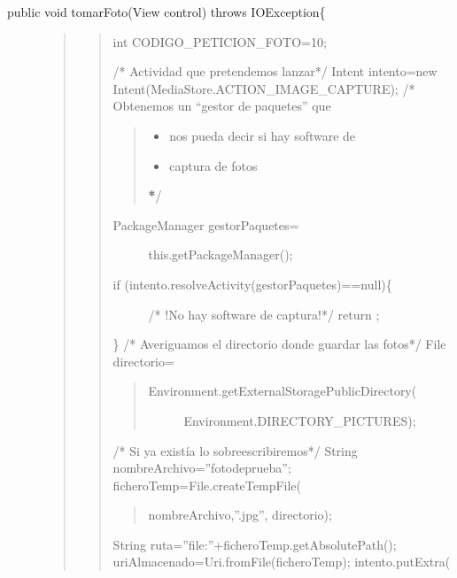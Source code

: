 \documentclass[a4paper,12pt,spanish]{sphinxmanual}
\begin{document}
\begin{description}
\item[{public void tomarFoto(View control) throws IOException\{}] \leavevmode\begin{quote}
\begin{quote}

int CODIGO\_PETICION\_FOTO=10;

/* Actividad que pretendemos lanzar*/
Intent intento=new Intent(MediaStore.ACTION\_IMAGE\_CAPTURE);
/* Obtenemos un ``gestor de paquetes'' que
\begin{quote}
\begin{itemize}
\item {} 
nos pueda decir si hay software de

\item {} 
captura de fotos

\end{itemize}

{\color{red}\bfseries{}*}/
\end{quote}
\begin{description}
\item[{PackageManager gestorPaquetes=}] \leavevmode
this.getPackageManager();

\item[{if (intento.resolveActivity(gestorPaquetes)==null)\{}] \leavevmode
/* !No hay software de captura!*/
return ;

\end{description}

\}
/* Averiguamos el directorio donde guardar las fotos*/
File directorio=
\begin{quote}
\begin{description}
\item[{Environment.getExternalStoragePublicDirectory(}] \leavevmode
Environment.DIRECTORY\_PICTURES);

\end{description}
\end{quote}

/* Si ya existía lo sobreescribiremos*/
String nombreArchivo=''fotodeprueba'';
ficheroTemp=File.createTempFile(
\begin{quote}

nombreArchivo,''.jpg'',
directorio);
\end{quote}

String ruta=''file:''+ficheroTemp.getAbsolutePath();
uriAlmacenado=Uri.fromFile(ficheroTemp);
intento.putExtra(
\begin{quote}


\end{quote}
\end{quote}
\end{quote}
\end{description}
\end{document}
